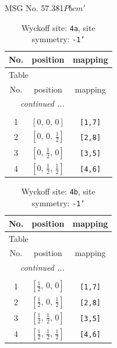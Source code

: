 \documentclass[fleqn,8pt]{jsarticle}
\begin{document}
\setcounter{MaxMatrixCols}{32}

\renewcommand{\tablename}{Table~}
\renewcommand{\figurename}{Figure~}
\begin{center}
\LARGE
MSG No. 57.381\quad$Pbcm'$
\end{center}
\renewcommand{\arraystretch}{1.2}
\begin{longtable}{ccc}
\caption{Wyckoff site: {\tt 4a}, site symmetry: {\tt -1'}}
 \\
 \hline \hline
No. & position & mapping \\ \hline \endfirsthead

\multicolumn{2}{l}{\tablename\ \thetable{}} \\
 \hline \hline
No. & position & mapping \\ \hline \endhead

 \hline \hline
\multicolumn{2}{r}{\footnotesize\it continued ...} \\ \endfoot

 \hline \hline
\multicolumn{2}{r}{} \\ \endlastfoot

1 & $\left[ 0,\, 0,\, 0 \right]$ & {\tt [1,7]} \\ \hline
2 & $\left[ 0,\, 0,\, \frac{1}{2} \right]$ & {\tt [2,8]} \\ \hline
3 & $\left[ 0,\, \frac{1}{2},\, 0 \right]$ & {\tt [3,5]} \\ \hline
4 & $\left[ 0,\, \frac{1}{2},\, \frac{1}{2} \right]$ & {\tt [4,6]} \\
\end{longtable}
\renewcommand{\arraystretch}{1.2}
\begin{longtable}{ccc}
\caption{Wyckoff site: {\tt 4b}, site symmetry: {\tt -1'}}
 \\
 \hline \hline
No. & position & mapping \\ \hline \endfirsthead

\multicolumn{2}{l}{\tablename\ \thetable{}} \\
 \hline \hline
No. & position & mapping \\ \hline \endhead

 \hline \hline
\multicolumn{2}{r}{\footnotesize\it continued ...} \\ \endfoot

 \hline \hline
\multicolumn{2}{r}{} \\ \endlastfoot

1 & $\left[ \frac{1}{2},\, 0,\, 0 \right]$ & {\tt [1,7]} \\ \hline
2 & $\left[ \frac{1}{2},\, 0,\, \frac{1}{2} \right]$ & {\tt [2,8]} \\ \hline
3 & $\left[ \frac{1}{2},\, \frac{1}{2},\, 0 \right]$ & {\tt [3,5]} \\ \hline
4 & $\left[ \frac{1}{2},\, \frac{1}{2},\, \frac{1}{2} \right]$ & {\tt [4,6]} \\
\end{longtable}
\end{document}
